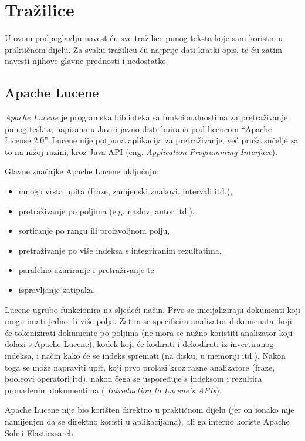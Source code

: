 \documentclass[a4paper,twoside,12pt]{scrreprt}
\begin{document}
\section{Tražilice}

U ovom podpoglavlju navest ću sve tražilice punog teksta koje sam koristio u praktičnom dijelu. Za svaku tražilicu ću najprije dati kratki opis, te ću zatim navesti njihove glavne prednosti i nedostatke.

\subsection{Apache Lucene}

\textit{Apache Lucene} je programska biblioteka sa funkcionalnostima za pretraživanje punog teskta, napisana u Javi i javno distribuirana pod licencom ``Apache License 2.0''. Lucene nije potpuna aplikacija za pretraživanje, već pruža sučelje za to na nižoj razini, kroz Java API (eng. \textit{Application Programming Interface}).

Glavne značajke Apache Lucene uključuju:

\begin{itemize}
  \item mnogo vrsta upita (fraze, zamjenski znakovi, intervali itd.),
  \item pretraživanje po poljima (e.g. naslov, autor itd.),
  \item sortiranje po rangu ili proizvoljnom polju,
  \item pretraživanje po više indeksa s integriranim rezultatima,
  \item paralelno ažuriranje i pretraživanje te
  \item ispravljanje zatipaka.
\end{itemize}

Lucene ugrubo funkcionira na sljedeći način. Prvo se inicijaliziraju dokumenti koji mogu imati jedno ili više polja. Zatim se specificira analizator dokumenata, koji će tokenizirati dokumente po poljima (ne mora se nužno koristiti analizator koji dolazi s Apache Lucene), kodek koji će kodirati i dekodirati iz invertiranog indeksa, i način kako će se indeks spremati (na disku, u memoriji itd.). Nakon toga se može napraviti upit, koji prvo prolazi kroz razne analizatore (fraze, booleovi operatori itd), nakon čega se uspoređuje s indeksom i rezultira pronađenim dokumentima (\cite{lucene} \textit{Introduction to Lucene's APIs}).

Apache Lucene nije bio korišten direktno u praktičnom dijelu (jer on ionako nije namijenjen da se direktno koristi u aplikacijama), ali ga interno koriste Apache Solr i Elasticsearch.
\end{document}
